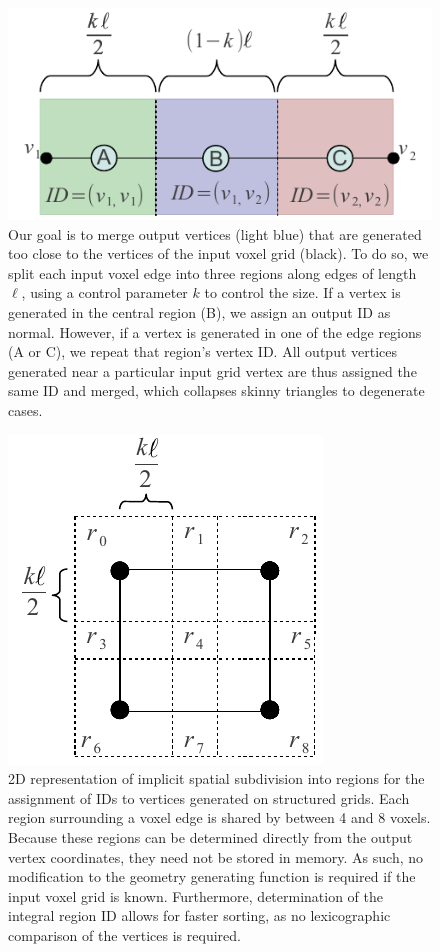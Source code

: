 \documentclass[10pt,journal,cspaper,compsoc]{IEEEtran}
\begin{document}
\begin{figure}[!tb]
\begin{center}
\includegraphics[height=0.5\columnwidth]{IDs.pdf}
\caption{Our goal is to merge output vertices (light blue) that are generated too close to the vertices of the input voxel grid (black). To do so, we split each input voxel edge into three regions along edges of length $\ell$, using a control parameter $k$ to control the size. If a vertex is generated in the central region (B), we assign an output ID as normal. However, if a vertex is generated in one of the edge regions (A or C), we repeat that region's vertex ID. All output vertices generated near a particular input grid vertex are thus assigned the same ID and merged, which collapses skinny triangles to degenerate cases.}
\label{fig:IDs}
\end{center}
\end{figure}

\begin{figure}[!tb]
\begin{center}
\includegraphics[height=0.5\columnwidth]{Subdivision.pdf}
\caption{2D representation of implicit spatial subdivision into regions for the assignment of IDs to vertices generated on structured grids. Each region surrounding a voxel edge is shared by between 4 and 8 voxels. Because these regions can be determined directly from the output vertex coordinates, they need not be stored in memory. As such, no modification to the geometry generating function is required if the input voxel grid is known. Furthermore, determination of the integral region ID allows for faster sorting, as no lexicographic comparison of the vertices is required.}
\label{fig:Subdivision}
\end{center}
\end{figure}
\end{document}
